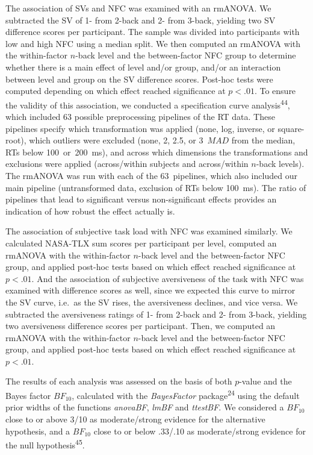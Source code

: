 \documentclass[
  man,floatsintext]{apa6}
\begin{document}
The association of SVs and NFC was examined with an rmANOVA.
We subtracted the SV of 1- from 2-back and 2- from 3-back, yielding two SV difference scores per participant.
The sample was divided into participants with low and high NFC using a median split.
We then computed an rmANOVA with the within-factor \(n\)-back level and the between-factor NFC group to determine whether there is a main effect of level and/or group, and/or an interaction between level and group on the SV difference scores.
Post-hoc tests were computed depending on which effect reached significance at \(p<.01\).
To ensure the validity of this association, we conducted a specification curve analysis\textsuperscript{44}, which included 63 possible preprocessing pipelines of the RT data.
These pipelines specify which transformation was applied (none, log, inverse, or square-root), which outliers were excluded (none, 2, 2.5, or 3~\(MAD\) from the median, RTs below 100~or~200~ms), and across which dimensions the transformations and exclusions were applied (across/within subjects and across/within \(n\)-back levels).
The rmANOVA was run with each of the 63~pipelines, which also included our main pipeline (untransformed data, exclusion of RTs below 100~ms).
The ratio of pipelines that lead to significant versus non-significant effects provides an indication of how robust the effect actually is.

The association of subjective task load with NFC was examined similarly.
We calculated NASA-TLX sum scores per participant per level, computed an rmANOVA with the within-factor \(n\)-back level and the between-factor NFC group, and applied post-hoc tests based on which effect reached significance at \(p<.01\).
And the association of subjective aversiveness of the task with NFC was examined with difference scores as well, since we expected this curve to mirror the SV curve, i.e.~as the SV rises, the aversiveness declines, and vice versa.
We subtracted the aversiveness ratings of 1- from 2-back and 2- from 3-back, yielding two aversiveness difference scores per participant.
Then, we computed an rmANOVA with the within-factor \(n\)-back level and the between-factor NFC group, and applied post-hoc tests based on which effect reached significance at \(p<.01\).

The results of each analysis was assessed on the basis of both \(p\)-value and the Bayes factor \(BF_{10}\), calculated with the \emph{BayesFactor} package\textsuperscript{24} using the default prior widths of the functions \emph{anovaBF}, \emph{lmBF} and \emph{ttestBF}.
We considered a \(BF_{10}\) close to or above 3/10 as moderate/strong evidence for the alternative hypothesis, and a \(BF_{10}\) close to or below .33/.10 as moderate/strong evidence for the null hypothesis\textsuperscript{45}.
\end{document}
